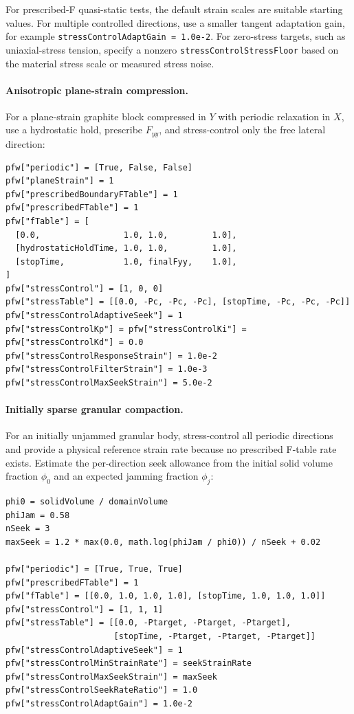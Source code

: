For prescribed-F quasi-static tests, the default strain scales are suitable
starting values.  For multiple controlled directions, use a smaller tangent
adaptation gain, for example \texttt{stressControlAdaptGain = 1.0e-2}.  For
zero-stress targets, such as uniaxial-stress tension, specify a nonzero
\texttt{stressControlStressFloor} based on the material stress scale or measured
stress noise.

\paragraph{Anisotropic plane-strain compression.}
For a plane-strain graphite block compressed in $Y$ with periodic relaxation in
$X$, use a hydrostatic hold, prescribe $F_{yy}$, and stress-control only the
free lateral direction:
\begin{lstlisting}[caption={Plane-strain anisotropic compression with X pressure control.}]
pfw["periodic"] = [True, False, False]
pfw["planeStrain"] = 1
pfw["prescribedBoundaryFTable"] = 1
pfw["prescribedFTable"] = 1
pfw["fTable"] = [
  [0.0,                 1.0, 1.0,         1.0],
  [hydrostaticHoldTime, 1.0, 1.0,         1.0],
  [stopTime,            1.0, finalFyy,    1.0],
]
pfw["stressControl"] = [1, 0, 0]
pfw["stressTable"] = [[0.0, -Pc, -Pc, -Pc], [stopTime, -Pc, -Pc, -Pc]]
pfw["stressControlAdaptiveSeek"] = 1
pfw["stressControlKp"] = pfw["stressControlKi"] = pfw["stressControlKd"] = 0.0
pfw["stressControlResponseStrain"] = 1.0e-2
pfw["stressControlFilterStrain"] = 1.0e-3
pfw["stressControlMaxSeekStrain"] = 5.0e-2
\end{lstlisting}

\paragraph{Initially sparse granular compaction.}
For an initially unjammed granular body, stress-control all periodic directions
and provide a physical reference strain rate because no prescribed F-table rate
exists.  Estimate the per-direction seek allowance from the initial solid volume
fraction $\phi_0$ and an expected jamming fraction $\phi_j$:
\begin{lstlisting}[caption={Sparse granular compaction to hydrostatic pressure.}]
phi0 = solidVolume / domainVolume
phiJam = 0.58
nSeek = 3
maxSeek = 1.2 * max(0.0, math.log(phiJam / phi0)) / nSeek + 0.02

pfw["periodic"] = [True, True, True]
pfw["prescribedFTable"] = 1
pfw["fTable"] = [[0.0, 1.0, 1.0, 1.0], [stopTime, 1.0, 1.0, 1.0]]
pfw["stressControl"] = [1, 1, 1]
pfw["stressTable"] = [[0.0, -Ptarget, -Ptarget, -Ptarget],
                      [stopTime, -Ptarget, -Ptarget, -Ptarget]]
pfw["stressControlAdaptiveSeek"] = 1
pfw["stressControlMinStrainRate"] = seekStrainRate
pfw["stressControlMaxSeekStrain"] = maxSeek
pfw["stressControlSeekRateRatio"] = 1.0
pfw["stressControlAdaptGain"] = 1.0e-2
\end{lstlisting}

